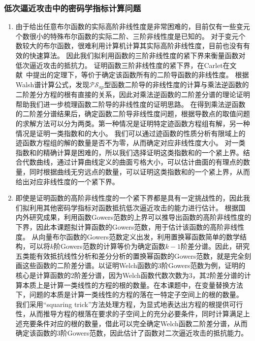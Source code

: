 \documentclass[a4paper,zihao=-4,AutoFakeBold]{ctexart}
\begin{document}
\subsubsection{低次逼近攻击中的密码学指标计算问题}
\begin{enumerate}[label=(\arabic{*})]
    \item 由于给出任意布尔函数的实际高阶非线性度是非常困难的，目前仅有一些变元个数很小的特殊布尔函数的实际二阶、三阶非线性度是已知的。
    对于变元个数较大的布尔函数，很难利用计算机计算其实际高阶非线性度，目前也没有有效的快速算法。
    因此我们拟利用函数的三阶非线性度的紧下界来衡量函数对低次逼近攻击的抵抗力。
    证明函数三阶非线性度的紧下界，在Carlet在文献~\cite{CC08IT}中提出的定理下，等价于确定该函数所有的二阶导函数的非线性度。
    根据Walsh谱计算公式，发现$\mathcal{PS}_{ap}$型函数二阶导的非线性度的计算与乘法逆函数的二阶差分方程的根有直接的关系，因此对乘法逆函数的二阶差分谱的理论证明帮助我们进一步梳理函数二阶导的非线性度的证明思路。
    在得到乘法逆函数的二阶差分谱结果后，确定函数二阶导非线性度问题，根据导数点的取值问题的求解方法可以分为两类。第一种情况是证明特定迹函数方程组有解，另一种情况是证明一类指数和的大小。
    我们可以通过迹函数的性质分析有限域上的迹函数方程组的解的数量是否不为零，从而确定对应非线性度大小。
    对一类指数和的精确计算是困难的，所以我们选择证明这类指数和的一个紧上界。结合代数曲线，通过计算曲线定义的曲面亏格大小，可以估计曲面的有理点的数量，同时根据曲线无穷远点的数量，可以证明这类指数和的一个紧上界，从而给出对应非线性度的一个紧下界。
    \item 即使是证明函数的高阶非线性度的一个紧下界都是具有一定挑战性的，因此我们拟利用其他密码学指标对函数抵抗低次逼近攻击的能力进行估计。
    根据国内外研究成果，利用函数Gowers范数的上界可以推导出函数的高阶非线性度的下界，因此本课题拟计算函数的Gowers范数，用于估计该函数的高阶非线性度。
    从向量布尔函数的Gowers范数定义出发，利用置换幂函数简单的数学结构，可以将$k$阶Gowers范数的计算等价为确定函数$k-1$阶差分谱。因此，研究五类能有效抵抗线性分析和差分分析的置换幂函数的Gowers范数，就是完全刻画这些函数的二阶差分谱。以证明Welch函数的$3$阶Gowers范数为例，证明的核心是计算函数的$2$阶差分谱，因为Welch函数代数次数为$3$，其$2$阶差分谱的计算本质上是计算一类线性的方程的根的数量。在本课题中，在变量替换方法下，问题的本质是计算一类线性的方程的落在一特定子空间上的根的数量。
    我们采用``squaring trick''方法处理方程，为显式地表达出方程的根提供可行性，从而推导方程的根落在要求的子空间上的充分必要条件，同时计算满足上述充要条件对应的根的数量，借此可以完全确定Welch函数二阶差分谱，从而确定该函数的$3$阶Gowers范数，因此估计了函数对二次逼近攻击的抵抗能力。
\end{enumerate}
\end{document}
